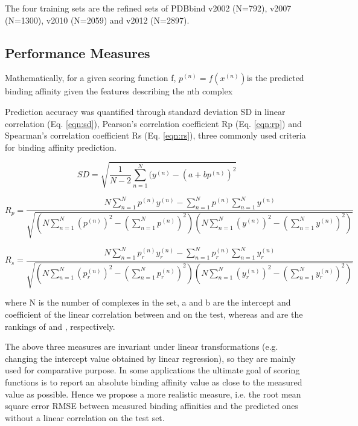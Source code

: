 \documentclass[journal=jacsat,manuscript=article]{achemso}
\begin{document}
The four training sets are the refined sets of PDBbind v2002 (N=792), v2007 (N=1300), v2010 (N=2059) and v2012 (N=2897).

\subsection{Performance Measures}

Mathematically, for a given scoring function f, $p^{(n)}=f(x^{(n)})$is the predicted binding affinity given the features   describing the nth complex 

Prediction accuracy was quantified through standard deviation SD in linear correlation (Eq. \ref{eqn:sd}), Pearson's correlation coefficient Rp (Eq. \ref{eqn:rp}) and Spearman's correlation coefficient Rs (Eq. \ref{eqn:rs}), three commonly used criteria for binding affinity prediction.

\begin{equation}
SD = \sqrt{\frac{1}{N-2}\sum_{n=1}^N(y^{(n)}-(a+bp^{(n)})^2}
\label{eqn:sd}
\end{equation}

\begin{equation}
R_p = \frac{N\sum_{n=1}^Np^{(n)}y^{(n)}-\sum_{n=1}^Np^{(n)}\sum_{n=1}^Ny^{(n)}}{\sqrt{(N\sum_{n=1}^N(p^{(n)})^2-(\sum_{n=1}^Np^{(n)})^2)(N\sum_{n=1}^N(y^{(n)})^2-(\sum_{n=1}^Ny^{(n)})^2)}}
\label{eqn:rp}
\end{equation}

\begin{equation}
R_s = \frac{N\sum_{n=1}^Np_r^{(n)}y_r^{(n)}-\sum_{n=1}^Np_r^{(n)}\sum_{n=1}^Ny_r^{(n)}}{\sqrt{(N\sum_{n=1}^N(p_r^{(n)})^2-(\sum_{n=1}^Np_r^{(n)})^2)(N\sum_{n=1}^N(y_r^{(n)})^2-(\sum_{n=1}^Ny_r^{(n)})^2)}}
\label{eqn:rs}
\end{equation}

where N is the number of complexes in the set, a and b are the intercept and coefficient of the linear correlation between   and   on the test, whereas   and   are the rankings of   and  , respectively. 

The above three measures are invariant under linear transformations (e.g. changing the intercept value obtained by linear regression), so they are mainly used for comparative purpose. In some applications the ultimate goal of scoring functions is to report an absolute binding affinity value as close to the measured value as possible. Hence we propose a more realistic measure, i.e. the root mean square error RMSE between measured binding affinities and the predicted ones without a linear correlation on the test set.
\end{document}
